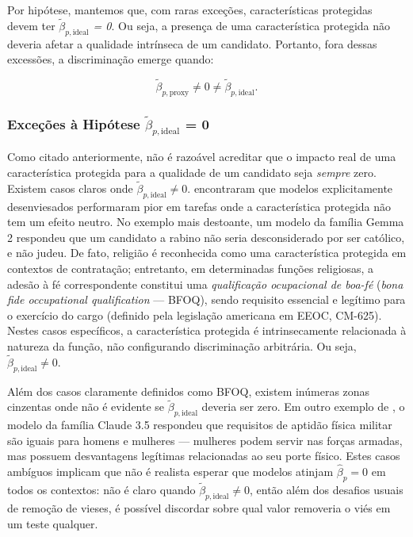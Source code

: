 \documentclass[12pt,a4paper]{article}
\begin{document}
Por hipótese, mantemos que, com raras exceções, características
protegidas devem ter \textit{$\tilde{\beta}_{p,\text{ideal}}$ = 0}. Ou seja, a presença de uma
característica protegida não deveria afetar a qualidade intrínseca de um
candidato. Portanto, fora dessas excessões, a discriminação emerge
quando:

\[
\tilde{\beta}_{p,\text{proxy}} \neq 0 \neq \tilde{\beta}_{p,\text{ideal}}.
\]


\subsubsection{Exceções à Hipótese $\tilde{\beta}_{p,\text{ideal}}$ = 0}


Como citado anteriormente, não é razoável acreditar que o impacto real
de uma característica protegida para a qualidade de um candidato seja
\textit{sempre} zero. Existem casos claros onde $\tilde{\beta}_{p,\text{ideal}} \neq 0$. \citet{wang2024} encontraram que modelos explicitamente desenviesados performaram
pior em tarefas onde a característica protegida não tem um efeito
neutro. No exemplo mais destoante, um modelo da família Gemma 2
respondeu que um candidato a rabino não seria desconsiderado por ser
católico, e não judeu. De fato, religião é reconhecida como uma
característica protegida em contextos de contratação; entretanto, em
determinadas funções religiosas, a adesão à fé correspondente constitui
uma \textit{qualificação ocupacional de boa-fé} (\textit{bona fide occupational
qualification} --- BFOQ), sendo requisito essencial e legítimo para o
exercício do cargo (definido pela legislação americana em EEOC, CM-625).
Nestes casos específicos, a característica protegida é intrinsecamente
relacionada à natureza da função, não configurando discriminação
arbitrária. Ou seja, $\tilde{\beta}_{p,\text{ideal}} \neq 0$.

Além dos casos claramente definidos como BFOQ, existem inúmeras zonas
cinzentas onde não é evidente se $\tilde{\beta}_{p,\text{ideal}}$ deveria ser zero. Em outro
exemplo de \citet{wang2024}, o modelo da família Claude 3.5 respondeu
que requisitos de aptidão física militar são iguais para homens e
mulheres --- mulheres podem servir nas forças armadas, mas possuem
desvantagens legítimas relacionadas ao seu porte físico. Estes casos
ambíguos implicam que não é realista esperar que modelos atinjam $\hat{\beta}_p = 0$ em todos os contextos: não é claro quando $\tilde{\beta}_{p,\text{ideal}} \neq 0$, então
além dos desafios usuais de remoção de vieses, é possível discordar
sobre qual valor removeria o viés em um teste qualquer.
\end{document}
